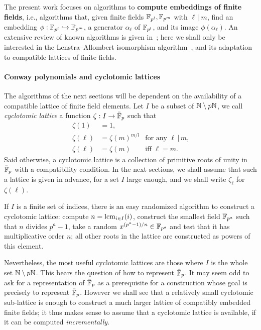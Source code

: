 \documentclass{sig-alternate}
\begin{document}
The present work focuses on algorithms to \textbf{compute embeddings
  of finite fields}, i.e., algorithms that, given finite fields
$\mathbb{F}_{p^l},\mathbb{F}_{p^m}$ with $\ell\,|\,m$, find an embedding
$\phi:\mathbb{F}_{p^l}\hookrightarrow\mathbb{F}_{p^m}$, a generator $\alpha_\ell$
of $\mathbb{F}_{p^l}$, and its image $\phi(\alpha_\ell)$. %
An extensive review of known algorithms is given
in~\cite{brieulle2018computing}; here we shall only be interested in
the Lenstra--Allombert isomorphism
algorithm~\cite{LenstraJr91,Allombert02}, and its adaptation to
compatible lattices of finite fields.


\paragraph{Conway polynomials and cyclotomic lattices}
The algorithms of the next sections will be dependent on the
availability of a compatible lattice of finite field elements. %
Let $I$ be a subset of $\mathbb{N}\setminus p\mathbb{N}$, we call \emph{cyclotomic
  lattice} a function $\zeta:I\to\bar{\mathbb{F}}_p$ such that
\begin{align}
  \zeta(1) &= 1,\\
  \label{eq:cyclotomic}
  \zeta(\ell) &= \zeta(m)^{m/l} &\text{for any $\ell\,|\,m$,}\\
  \zeta(\ell) &= \zeta(m)      &\text{iff $\ell=m$.}
\end{align}
Said otherwise, a cyclotomic lattice is a collection of primitive
roots of unity in $\bar{\mathbb{F}}_p$ with a compatibility condition. %
In the next sections, we shall assume that such a lattice is given in
advance, for a set $I$ large enough, and we shall write $\zeta_\ell$ for
$\zeta(\ell)$.

If $I$ is a finite set of indices, there is an easy randomized
algorithm to construct a cyclotomic lattice: compute
$n=\operatorname{lcm}_{i\in I}(i)$, construct the smallest field $\mathbb{F}_{p^a}$ such
that $n$ divides $p^a-1$, take a random $x^{(p^a-1)/n}\in\mathbb{F}_{p^a}$ and
test that it has multiplicative order $n$; all other roots in the
lattice are constructed as powers of this element.

Nevertheless, the most useful cyclotomic lattices are those where $I$
is the whole set $\mathbb{N}\setminus p\mathbb{N}$. %
This bears the question of how to represent $\bar{\mathbb{F}}_p$. %
It may seem odd to ask for a representation of $\bar{\mathbb{F}}_p$ as a
prerequisite for a construction whose goal is precisely to represent
$\bar{\mathbb{F}}_p$. %
However we shall see that a relatively small cyclotomic sub-lattice is
enough to construct a much larger lattice of compatibly embedded
finite fields; it thus makes sense to assume that a cyclotomic lattice
is available, if it can be computed \emph{incrementally}.
\end{document}
